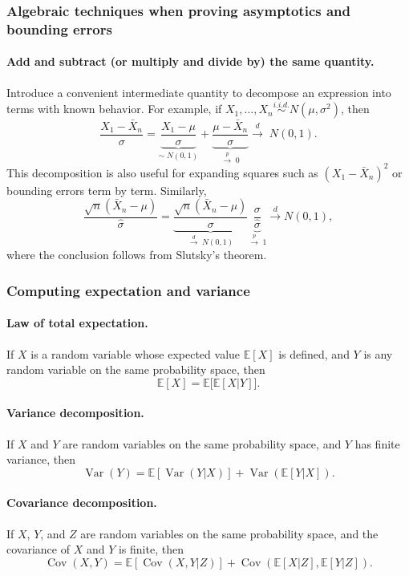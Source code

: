 \documentclass{article}
\theoremstyle{break}
\newcommand{\E}{\ensuremath{\mathbb{E}}}
\DeclareMathOperator{\Var}{Var}
\DeclareMathOperator{\Cov}{Cov}
\begin{document}

\subsubsection{Algebraic techniques when proving asymptotics and bounding errors}
\paragraph{Add and subtract (or multiply and divide by) the same quantity.} Introduce a convenient intermediate quantity to decompose an expression into terms with known behavior. For example, if $X_1,\ldots,X_n \stackrel{i.i.d.}{\sim} N(\mu,\sigma^2)$, then
\[
\frac{X_1-\bar{X}_n}{\sigma}
=
\underbrace{\frac{X_1-\mu}{\sigma}}_{\sim\; N(0,1)}
+
\underbrace{\frac{\mu-\bar{X}_n}{\sigma}}_{\stackrel{p}{\to}\; 0}
\stackrel{d}{\to}\; N(0,1).
\]
This decomposition is also useful for expanding squares such as $(X_1-\bar{X}_n)^2$ or bounding errors term by term. Similarly,
\[
\frac{\sqrt{n}(\bar{X}_n-\mu)}{\hat{\sigma}}
=
\underbrace{\frac{\sqrt{n}(\bar{X}_n-\mu)}{\sigma}}_{\stackrel{d}{\to}\; N(0,1)}
\underbrace{\frac{\sigma}{\hat{\sigma}}}_{\stackrel{p}{\to}\; 1}
\stackrel{d}{\to} N(0,1),
\]
where the conclusion follows from Slutsky's theorem.

\subsubsection{Computing expectation and variance}
\paragraph{Law of total expectation.}
If $X$ is a random variable whose expected value $\E[X]$ is defined, and $Y$ is any random variable on the same probability space, then
\[
\E[X] = \E\big[\E[X|Y]\big].
\]

\paragraph{Variance decomposition.}
If $X$ and $Y$ are random variables on the same probability space, and $Y$ has finite variance, then
\[
\Var(Y) = \E[\Var(Y|X)] + \Var(\E[Y|X]).
\]

\paragraph{Covariance decomposition.}
If $X$, $Y$, and $Z$ are random variables on the same probability space, and the covariance of $X$ and $Y$ is finite, then
\[
\Cov(X,Y) = \E[\Cov(X,Y | Z)] + \Cov(\E[X|Z], \E[Y|Z]).
\]
\end{document}
